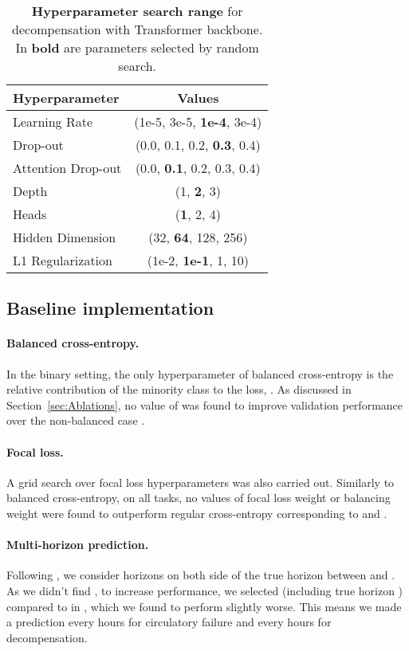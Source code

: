 \documentclass[nohyperref]{article}
\begin{document}
\begin{table}[tbh!]
    \centering
\caption{\textbf{Hyperparameter search range} for {decompensation} with Transformer \citep{DBLP:conf/nips/VaswaniSPUJGKP17} backbone. In \textbf{bold} are parameters selected by random search.}
\begin{tabular}{lc}
\toprule
Hyperparameter & Values\\
\midrule
\midrule
Learning Rate & (1e-5, 3e-5, \textbf{1e-4}, 3e-4) \\
\midrule
Drop-out & (0.0, 0.1, 0.2, \textbf{0.3}, 0.4) \\
\midrule
Attention Drop-out &   (0.0, \textbf{0.1}, 0.2, 0.3, 0.4) \\
\midrule
Depth &   (1, \textbf{2}, 3) \\
\midrule
Heads &  (\textbf{1}, 2, 4) \\
\midrule
Hidden Dimension &  (32, \textbf{64}, 128, 256) \\
\midrule
L1 Regularization &  (1e-2, \textbf{1e-1}, 1, 10)\\
\bottomrule
\end{tabular}
\label{tab:hp-search-decomp}
\end{table}


\subsection{Baseline implementation}


\paragraph{Balanced cross-entropy.}
In the binary setting, the only hyperparameter of balanced cross-entropy is the relative contribution of the minority class to the loss, . As discussed in Section~\ref{sec:Ablations}, no value of  was found to improve validation performance over the non-balanced case .

\paragraph{Focal loss.}
A grid search over focal loss hyperparameters was also carried out.
Similarly to balanced cross-entropy, on all tasks, no values of focal loss weight  or balancing weight  were found to outperform regular cross-entropy corresponding to  and .

\paragraph{Multi-horizon prediction.} Following \citet{tomavsev2019}, we consider  horizons on both side of the true horizon  between  and . As we didn't find , to increase performance, we selected  (including true horizon ) compared to  in \citet{tomavsev2019}, which we found to perform slightly worse. This means we made a prediction every  hours for circulatory failure and every  hours for {decompensation}. 
\end{document}
